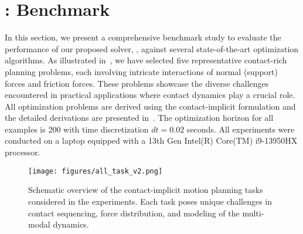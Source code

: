 
\section{\crisp: Benchmark}
\label{sec:exp}
In this section, we present a comprehensive benchmark study to evaluate the performance of our proposed solver, , against several state-of-the-art optimization algorithms. As illustrated in~, we have selected five representative contact-rich planning problems, each involving intricate interactions of normal (support) forces and friction forces. These problems showcase the diverse challenges encountered in practical applications where contact dynamics play a crucial role. All optimization problems are derived using the contact-implicit formulation and the detailed derivations are presented in~. The optimization horizon for all examples is 200 with time discretization $dt=0.02$ seconds. All experiments were conducted on a laptop equipped with a 13th Gen Intel(R) Core(TM) i9-13950HX processor. 

\begin{figure*}[t] 
    \centering
    \texttt{[image: figures/all\_task\_v2.png]}
    \caption{Schematic overview of the contact-implicit motion planning tasks considered in the experiments. Each task poses unique challenges in contact sequencing, force distribution, and modeling of the multi-modal dynamics.}
    \label{fig:all_tasks}
    \vspace{-3mm}
\end{figure*}


